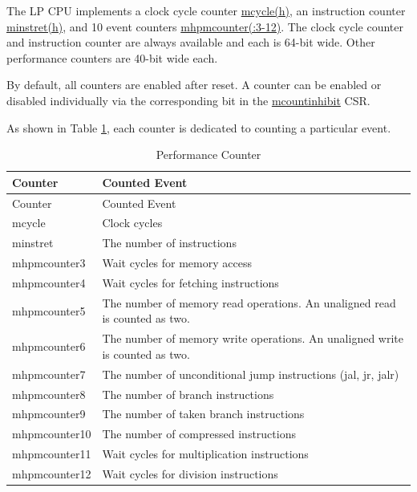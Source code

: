 \documentclass[main\_\_EN.tex]{subfiles}
\begin{document}
The LP CPU implements a clock cycle counter \hyperref[regdesc:LPMCYCLE]{mcycle(h)}, an instruction counter \hyperref[regdesc:LPMINSTRET]{minstret(h)}, and 10 event counters \hyperref[regdesc:LPMHPMCOUNTER]{mhpmcounter(:3-12)}. The clock cycle counter and instruction counter are always available and each is 64-bit wide. Other performance counters are 40-bit wide each.

By default, all counters are enabled after reset. A counter can be enabled or disabled individually via the corresponding bit in the \hyperref[regdesc:LPMCOUNTINHIBIT]{mcountinhibit} CSR.

As shown in Table \ref{tab:ulp-pccr}, each counter is dedicated to counting a particular event.

\begin{longtable}[c]{|l|l|}
    \caption{Performance Counter}\label{tab:ulp-pccr}\\\hline
    \rowcolor{lightgray}
    Counter & Counted Event \\\hline
    \endfirsthead
    \hline
    \rowcolor{lightgray}
    Counter & Counted Event \\\hline
    \endhead
    \endfoot

    mcycle & Clock cycles \\\hline
    minstret & The number of instructions \\\hline
    mhpmcounter3 & Wait cycles for memory access \\\hline
    mhpmcounter4 & Wait cycles for fetching instructions \\\hline
    mhpmcounter5 & The number of memory read operations. An unaligned read is counted as two.  \\\hline

    mhpmcounter6 & The number of memory write operations. An unaligned write is counted as two. \\\hline
    mhpmcounter7 & The number of unconditional jump instructions (jal, jr, jalr) \\\hline
    mhpmcounter8 & The number of branch instructions \\\hline
    mhpmcounter9 &  The number of taken branch instructions \\\hline
    mhpmcounter10 & The number of compressed instructions \\\hline
    mhpmcounter11 & Wait cycles for multiplication instructions \\\hline
    mhpmcounter12 & Wait cycles for division instructions \\\hline

\end{longtable}
\end{document}
